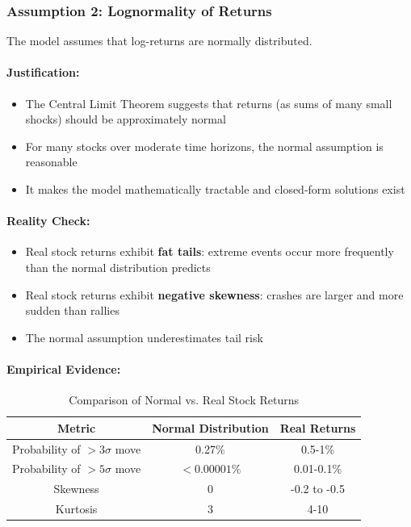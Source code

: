 \documentclass[12pt,a4paper]{article}
\begin{document}
\subsubsection{Assumption 2: Lognormality of Returns}

The model assumes that log-returns are normally distributed.

\paragraph{Justification:}
\begin{itemize}
    \item The Central Limit Theorem suggests that returns (as sums of many small shocks) should be approximately normal
    \item For many stocks over moderate time horizons, the normal assumption is reasonable
    \item It makes the model mathematically tractable and closed-form solutions exist
\end{itemize}

\paragraph{Reality Check:}
\begin{itemize}
    \item Real stock returns exhibit \textbf{fat tails}: extreme events occur more frequently than the normal distribution predicts
    \item Real stock returns exhibit \textbf{negative skewness}: crashes are larger and more sudden than rallies
    \item The normal assumption underestimates tail risk
\end{itemize}

\paragraph{Empirical Evidence:}
\begin{table}[H]
\centering
\begin{tabular}{|c|c|c|}
\hline
\textbf{Metric} & \textbf{Normal Distribution} & \textbf{Real Returns} \\
\hline
Probability of $> 3\sigma$ move & 0.27\% & 0.5-1\% \\
Probability of $> 5\sigma$ move & $< 0.00001\%$ & 0.01-0.1\% \\
Skewness & 0 & -0.2 to -0.5 \\
Kurtosis & 3 & 4-10 \\
\hline
\end{tabular}
\caption{Comparison of Normal vs. Real Stock Returns}
\end{table}
\end{document}
